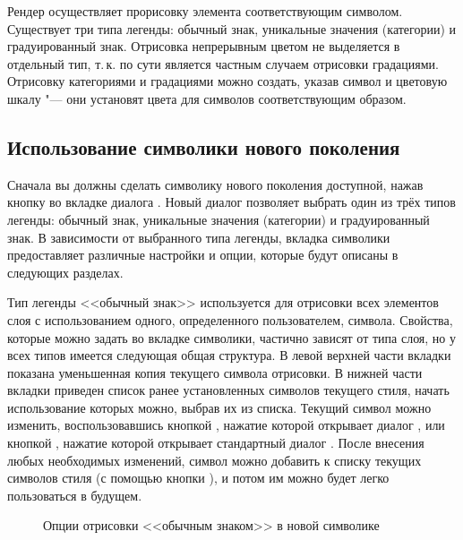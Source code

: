 
Рендер осуществляет прорисовку элемента соответствующим символом.
Существует три типа легенды: обычный знак, уникальные значения (категории)
и градуированный знак. Отрисовка непрерывным цветом не выделяется в отдельный
тип, т.\,к. по сути является частным случаем отрисовки градациями.
Отрисовку категориями и градациями можно создать, указав символ
и цветовую шкалу "--- они установят цвета для символов соответствующим
образом.

\subsection{Использование символики нового поколения}

Сначала вы должны сделать символику нового поколения доступной, нажав
кнопку  во вкладке  диалога
. Новый диалог позволяет выбрать один из
трёх типов легенды: обычный знак, уникальные значения (категории)
и градуированный знак. В зависимости от выбранного типа легенды, вкладка
символики предоставляет различные настройки и опции, которые будут описаны
в следующих разделах.


Тип легенды <<обычный знак>> используется для отрисовки всех элементов слоя с
использованием одного, определенного пользователем, символа. Свойства, которые
можно задать во вкладке символики, частично зависят от типа слоя, но у всех
типов имеется следующая общая структура. В левой верхней части вкладки
показана уменьшенная копия текущего символа отрисовки. В нижней части
вкладки приведен список ранее установленных символов текущего стиля, начать
использование которых можно, выбрав их из списка. Текущий символ можно
изменить, воспользовавшись кнопкой , нажатие которой
открывает диалог , или кнопкой ,
нажатие которой открывает стандартный диалог . После внесения
любых необходимых изменений, символ можно добавить к списку текущих символов
стиля (с помощью кнопки ), и потом им можно будет
легко пользоваться в будущем.

\begin{figure}[ht]
\centering
   \hspace{1cm}
   \hspace{1cm}
\caption{Опции отрисовки <<обычным знаком>> в новой символике \wincaption}
\end{figure}

